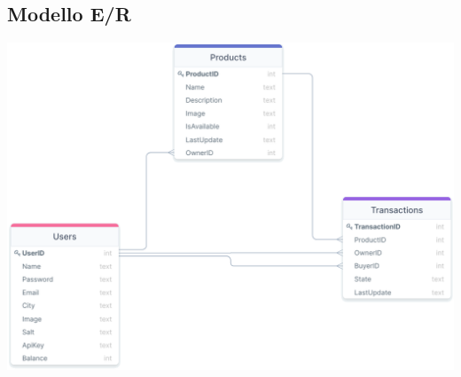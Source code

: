 \subsection{Modello E/R}
\begin{center}
    \includegraphics[scale=0.29]{images/modello_e_r.png}
\end{center}

